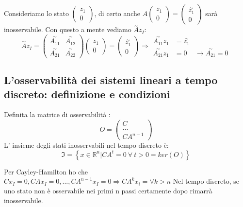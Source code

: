 \documentclass{article}
\begin{document}
Consideriamo lo stato $\begin{pmatrix}z_1\\0\end{pmatrix}$,
di certo anche $A\begin{pmatrix}z_1\\0\end{pmatrix}=\begin{pmatrix}\overset{\sim }{z_1}\\0\end{pmatrix}$
sarà inosservabile.
Con questo a mente vediamo $\overset{\sim}{A}z_I$:
\[
    \overset{\sim}{A}z_I=\begin{pmatrix}\overset{\sim }{A_{11}}&\overset{\sim }{A_{12}}\\
        \overset{\sim }{A_{21}}&\overset{\sim }{A_{22}}\end{pmatrix}\begin{pmatrix}z_1\\0\end{pmatrix}=
    \begin{pmatrix}\overset{\sim }{z_1}\\0\end{pmatrix} \Longrightarrow
    \begin{array}{rcl}
    \overset{\sim }{A_{11}}z_{1} &= \overset{\sim }{z_1}&\\
    \overset{\sim }{A_{21}}z_{1} &= 0 &\to  \overset{\sim }{A_{21}}=0
    \end{array}
\]

















\subsection{L'osservabilità dei sistemi lineari a tempo discreto: definizione e condizioni}
Definita la matrice di osservabilità :
\[O = \begin{pmatrix}C\\...\\CA^{n-1}\end{pmatrix}\]
L' insieme degli stati inosservabili nel tempo discreto è:
\[\mathfrak{I} = \left\{ x\in\mathbb{R}^n | CA^t=0\ \forall\ t > 0 = ker(O)\right\}\]

Per Cayley-Hamilton ho che $Cx_I=0,CAx_I=0,...,CA^{n-1}x_I=0 \Longrightarrow CA^kx_i = \forall k>n$
Nel tempo discreto, se uno stato non è osservabile nei primi n passi certamente dopo rimarrà inosservabile.
\end{document}
